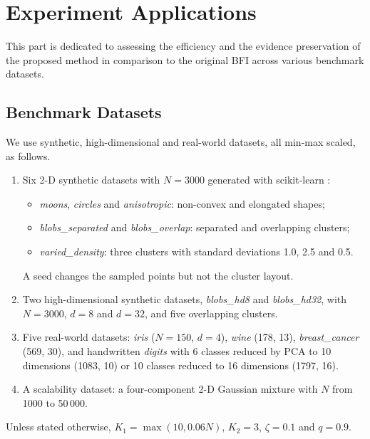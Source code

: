 \documentclass[journal]{IEEEtran}
\begin{document}
\section{Experiment Applications}\label{sec:exp}
This part is dedicated to assessing the efficiency and the evidence preservation of the proposed method in comparison to the original BFI across various benchmark datasets.

\subsection{Benchmark Datasets}
We use synthetic, high-dimensional and real-world datasets, all min-max scaled, as follows.
\begin{enumerate}
\item Six 2-D synthetic datasets with $N=3000$ generated with scikit-learn \cite{pedregosa2011}:
\begin{itemize}
\item \emph{moons}, \emph{circles} and \emph{anisotropic}: non-convex and elongated shapes;
\item \emph{blobs\_separated} and \emph{blobs\_overlap}: separated and overlapping clusters;
\item \emph{varied\_density}: three clusters with standard deviations 1.0, 2.5 and 0.5.
\end{itemize}
A seed changes the sampled points but not the cluster layout.
\item Two high-dimensional synthetic datasets, \emph{blobs\_hd8} and \emph{blobs\_hd32}, with $N=3000$, $d=8$ and $d=32$, and five overlapping clusters.
\item Five real-world datasets: \emph{iris} ($N=150$, $d=4$), \emph{wine} (178, 13), \emph{breast\_cancer} (569, 30), and handwritten \emph{digits} with 6 classes reduced by PCA to 10 dimensions (1083, 10) or 10 classes reduced to 16 dimensions (1797, 16).
\item A scalability dataset: a four-component 2-D Gaussian mixture with $N$ from 1000 to 50\,000.
\end{enumerate}
Unless stated otherwise, $K_1=\max(10,0.06N)$, $K_2=3$, $\zeta=0.1$ and $q=0.9$.
\end{document}
